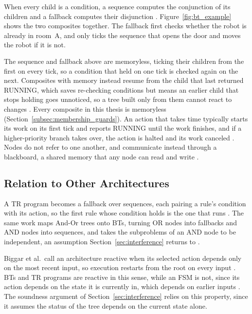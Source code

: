     When every child is a condition, a sequence computes the conjunction of its children and a fallback computes their disjunction \cite{ogren2012, colledanchise2016tr}.
    Figure~\ref{fig:bt_example} shows the two composites together.
    The fallback first checks whether the robot is already in room~A, and only ticks the sequence that opens the door and moves the robot if it is not.

    

    The sequence and fallback above are memoryless, ticking their children from the first on every tick, so a condition that held on one tick is checked again on the next.
    Composites with memory instead resume from the child that last returned RUNNING, which saves re-checking conditions but means an earlier child that stops holding goes unnoticed, so a tree built only from them cannot react to changes \cite{marzinotto2014, colledanchise2021implementation}.
    Every composite in this thesis is memoryless (Section~\ref{subsec:membership_guards}).  %
    An action that takes time typically starts its work on its first tick and reports RUNNING until the work finishes, and if a higher-priority branch takes over, the action is halted and its work canceled \cite{colledanchise2021implementation}.
    Nodes do not refer to one another, and communicate instead through a blackboard, a shared memory that any node can read and write \cite{colledanchise2021implementation}.

    \subsection{Relation to Other Architectures}
    \label{subsec:bt_relation}
    A TR program becomes a fallback over sequences, each pairing a rule's condition with its action, so the first rule whose condition holds is the one that runs \cite{colledanchise2016tr}.
    The same work maps And-Or trees onto BTs, turning OR nodes into fallbacks and AND nodes into sequences, and takes the subproblems of an AND node to be independent, an assumption Section~\ref{sec:interference} returns to \cite{colledanchise2016tr}.

    Biggar et al.\ call an architecture reactive when its selected action depends only on the most recent input, so execution restarts from the root on every input \cite{biggar2021}.
    BTs and TR programs are reactive in this sense, while an FSM is not, since its action depends on the state it is currently in, which depends on earlier inputs \cite{biggar2021}.
    The soundness argument of Section~\ref{sec:interference} relies on this property, since it assumes the status of the tree depends on the current state alone.

